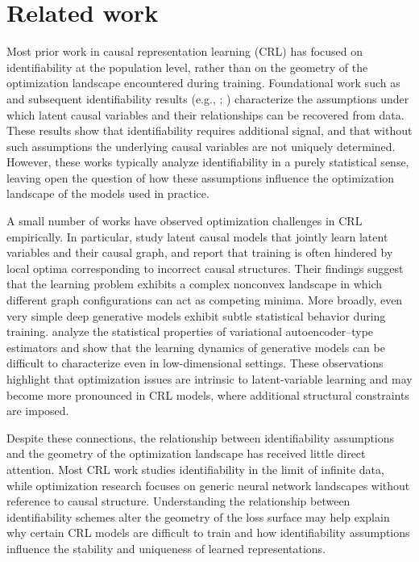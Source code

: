 \documentclass{article} %
\begin{document}
\section{Related work}

Most prior work in causal representation learning (CRL) has focused on identifiability at the population level, rather than on the geometry of the optimization landscape encountered during training. Foundational work such as \citet{Scholkopf2021CRL} and subsequent identifiability results (e.g., \citet{VonKugelgen2024IdentifiableCRL}; \citet{Varici2024ScoreCRL}) characterize the assumptions under which latent causal variables and their relationships can be recovered from data. These results show that identifiability requires additional signal, and that without such assumptions the underlying causal variables are not uniquely determined. However, these works typically analyze identifiability in a purely statistical sense, leaving open the question of how these assumptions influence the optimization landscape of the models used in practice.

A small number of works have observed optimization challenges in CRL empirically. In particular, \citet{Brehmer2022LatentCausalModels} study latent causal models that jointly learn latent variables and their causal graph, and report that training is often hindered by local optima corresponding to incorrect causal structures. Their findings suggest that the learning problem exhibits a complex nonconvex landscape in which different graph configurations can act as competing minima. More broadly, even very simple deep generative models exhibit subtle statistical behavior during training. \citet{KwonChae2024VAE} analyze the statistical properties of variational autoencoder–type estimators and show that the learning dynamics of generative models can be difficult to characterize even in low-dimensional settings. These observations highlight that optimization issues are intrinsic to latent-variable learning and may become more pronounced in CRL models, where additional structural constraints are imposed.

Despite these connections, the relationship between identifiability assumptions and the geometry of the optimization landscape has received little direct attention. Most CRL work studies identifiability in the limit of infinite data, while optimization research focuses on generic neural network landscapes without reference to causal structure. Understanding the relationship between identifiability schemes alter the geometry of the loss surface may help explain why certain CRL models are difficult to train and how identifiability assumptions influence the stability and uniqueness of learned representations.
\end{document}
